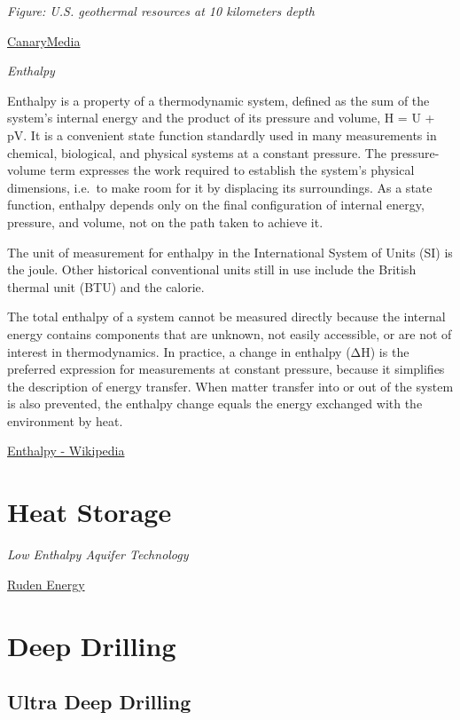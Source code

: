 \documentclass[
]{book}
\begin{document}
\emph{Figure: U.S. geothermal resources at 10 kilometers depth}

\href{https://www.canarymedia.com/articles/hot-and-bothered-about-geothermal-energy/}{CanaryMedia}

\emph{Enthalpy}

Enthalpy is a property of a thermodynamic system, defined as
the sum of the system's internal energy and the product of its pressure and volume,
H = U + pV.
It is a convenient state function standardly used in many measurements
in chemical, biological, and physical systems at a constant pressure.
The pressure-volume term expresses the work required to establish the system's physical dimensions,
i.e.~to make room for it by displacing its surroundings.
As a state function, enthalpy depends only on
the final configuration of internal energy, pressure, and volume,
not on the path taken to achieve it.

The unit of measurement for enthalpy in the International System of Units (SI) is the joule.
Other historical conventional units still in use include the British thermal unit (BTU) and the calorie.

The total enthalpy of a system cannot be measured directly because the internal energy contains components that are unknown, not easily accessible, or are not of interest in thermodynamics. In practice, a change in enthalpy (ΔH) is the preferred expression for measurements at constant pressure, because it simplifies the description of energy transfer. When matter transfer into or out of the system is also prevented, the enthalpy change equals the energy exchanged with the environment by heat.

\href{https://en.wikipedia.org/wiki/Enthalpy}{Enthalpy - Wikipedia}

\hypertarget{heat-storage}{%
\section{Heat Storage}\label{heat-storage}}

\emph{Low Enthalpy Aquifer Technology}

\href{https://rudenas.com/}{Ruden Energy}

\hypertarget{deep-drilling}{%
\section{Deep Drilling}\label{deep-drilling}}

\hypertarget{ultra-deep-drilling}{%
\subsection{Ultra Deep Drilling}\label{ultra-deep-drilling}}
\end{document}
